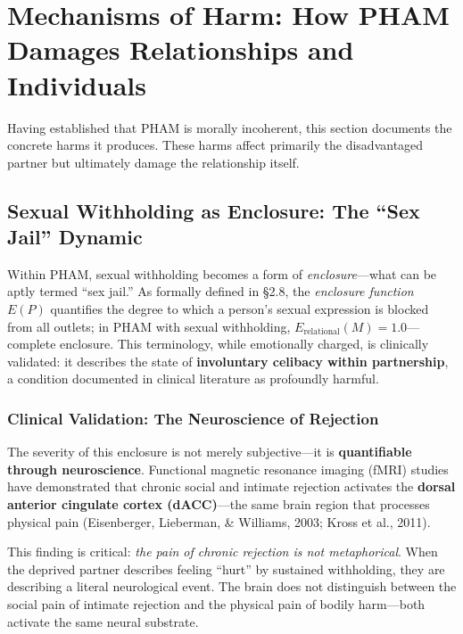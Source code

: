 \documentclass[12pt, letterpaper]{article}
\begin{document}
\section{Mechanisms of Harm: How PHAM Damages Relationships and Individuals}

Having established that PHAM is morally incoherent, this section documents the concrete harms it produces. These harms affect primarily the disadvantaged partner but ultimately damage the relationship itself.

\subsection{Sexual Withholding as Enclosure: The ``Sex Jail'' Dynamic}

Within PHAM, sexual withholding becomes a form of \textit{enclosure}---what can be aptly termed ``sex jail.'' As formally defined in \S 2.8, the \textit{enclosure function} $E(P)$ quantifies the degree to which a person's sexual expression is blocked from all outlets; in PHAM with sexual withholding, $E_{\text{relational}}(M) = 1.0$---complete enclosure. This terminology, while emotionally charged, is clinically validated: it describes the state of \textbf{involuntary celibacy within partnership}, a condition documented in clinical literature as profoundly harmful.

\subsubsection{Clinical Validation: The Neuroscience of Rejection}

The severity of this enclosure is not merely subjective---it is \textbf{quantifiable through neuroscience}. Functional magnetic resonance imaging (fMRI) studies have demonstrated that chronic social and intimate rejection activates the \textbf{dorsal anterior cingulate cortex (dACC)}---the same brain region that processes physical pain (Eisenberger, Lieberman, \& Williams, 2003; Kross et al., 2011).

This finding is critical: \textit{the pain of chronic rejection is not metaphorical}. When the deprived partner describes feeling ``hurt'' by sustained withholding, they are describing a literal neurological event. The brain does not distinguish between the social pain of intimate rejection and the physical pain of bodily harm---both activate the same neural substrate.
\end{document}
